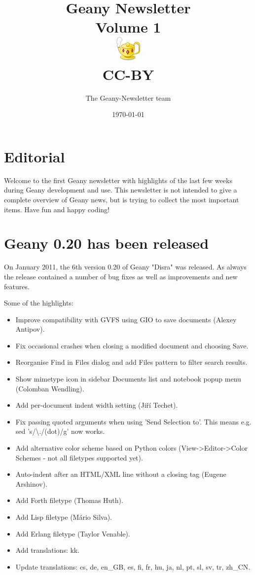 \documentclass[%
paper=a4,%
fontsize=12pt,%
twoside=false,%
DIV18,
headsepline,
plainheadsepline,
footsepline,
plainfootsepline,
parskip=half,%
openany,%
]{scrartcl}
\title{Geany Newsletter \\[1ex]
	\small{Volume 1} \\[1ex]
	\includegraphics{img/geany.png} \\[1.5ex]
	CC-BY}
\author{The Geany-Newsletter team}
\date{\today}
\begin{document}
\maketitle{}

\tableofcontents{}

\newpage{}

\section*{Editorial}

Welcome to the first Geany newsletter with highlights of the last few weeks
during Geany development and use. This newsletter is not intended to give a complete
overview of Geany news, but is trying to collect the most important items.
Have fun and happy coding!


\section{Geany 0.20 has been released}

On January 2011, the 6th version 0.20 of Geany "Disra" was released. As always
the release contained a number of bug fixes as well as improvements and new features.

Some of the highlights:

\begin{itemize}
	\item Improve compatibility with GVFS using GIO to save documents (Alexey Antipov).
	\item Fix occasional crashes when closing a modified document and choosing Save.
	\item Reorganise Find in Files dialog and add Files pattern to filter search results.
	\item Show mimetype icon in sidebar Documents list and notebook popup menu (Colomban Wendling).
	\item Add per-document indent width setting (Jiří Techet).
	\item Fix passing quoted arguments when using 'Send Selection to'. This means e.g. sed 's/\textbackslash{}./(dot)/g' now works.
	\item Add alternative color scheme based on Python colors (View->Editor->Color Schemes - not all filetypes supported yet).
	\item Auto-indent after an HTML/XML line without a closing tag (Eugene Arshinov).
	\item Add Forth filetype (Thomas Huth).
	\item Add Lisp filetype (Mário Silva).
	\item Add Erlang filetype (Taylor Venable).
	\item Add translations: kk.
	\item Update translations: cs, de, en\_GB, es, fi, fr, hu, ja, nl, pt, sl, sv, tr, zh\_CN.
\end{itemize}
\end{document}
